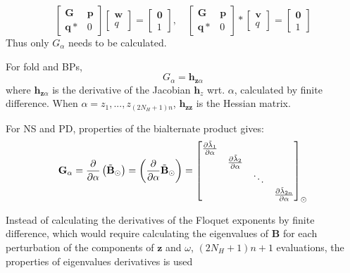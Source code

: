 \begin{equation}
  \begin{bmatrix}
    \bm G & \bm p \\
    \bm q* & 0
  \end{bmatrix}
  \begin{bmatrix}
    \bm w \\ q
  \end{bmatrix}
  =
  \begin{bmatrix}
    \bm 0 \\ 1
  \end{bmatrix}, \quad
    \begin{bmatrix}
    \bm G & \bm p \\
    \bm q* & 0
  \end{bmatrix}*
  \begin{bmatrix}
    \bm v \\ q
  \end{bmatrix}
  =
  \begin{bmatrix}
    \bm 0 \\ 1
  \end{bmatrix}
  \label{eq:bordered_system2}
\end{equation}
Thus only $G_\alpha$ needs to be calculated.

For fold and BPs,
\begin{equation}
  G_\alpha = \bm h_{\bm z \alpha}
\end{equation}
where $\bm h_{\bm z \alpha}$ is the derivative of the Jacobian $\bm h_z$ wrt.
$\alpha$, calculated by finite difference. When $\alpha = z_1,...,z_{(2N_H
  +1)n}$, $\bm h_{\bm z \bm z}$ is the Hessian matrix.

For NS and PD, properties of the bialternate product gives:
\begin{equation}
  \bm G_\alpha = \frac{\p}{\p \alpha} \left( \tilde{\bm B}_\odot \right) =
  \left( \frac{\p}{\p \alpha} \tilde{\bm B}_\odot \right) =
  \begin{bmatrix}
    \frac{\p \tilde{\lambda}_1}{\p \alpha} \\
    & \frac{\p \tilde{\lambda}_2}{\p \alpha} \\
    & & \ddots \\
    & & & \frac{\p \tilde{\lambda}_{2n}}{\p \alpha}
  \end{bmatrix}_\odot
\end{equation}

Instead of calculating the derivatives of the Floquet exponents by finite
difference, which would require calculating the eigenvalues of $\bm B$ for each
perturbation of the components of $\bm z$ and $\omega$, $(2N_H+1)n + 1$
evaluations, the properties of eigenvalues derivatives is
used~\autocite{aa2007a}

